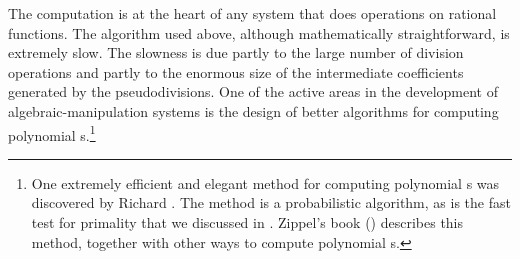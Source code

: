 \noindent
The  computation is at the heart of any system that does
operations on rational functions.  The algorithm used above, although
mathematically straightforward, is extremely slow.  The slowness is due partly
to the large number of division operations and partly to the enormous size of
the intermediate coefficients generated by the pseudodivisions.  One of the
active areas in the development of algebraic-manipulation systems is the design
of better algorithms for computing polynomial s.\footnote{One
extremely efficient and elegant method for computing polynomial s
was discovered by Richard .  The method is a probabilistic
algorithm, as is the fast test for primality that we discussed in .  Zippel's book () describes this method, together with
other ways to compute polynomial s.}
